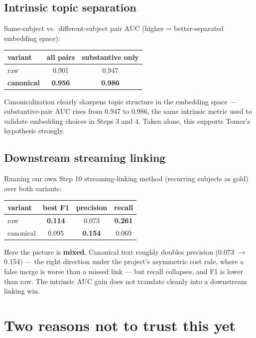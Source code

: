 \documentclass[11pt,a4paper]{article}
\begin{document}
\subsection{Intrinsic topic separation}

Same-subject vs.\ different-subject pair AUC (higher = better-separated embedding space):

\begin{center}
\begin{tabular}{lcc}
\toprule
variant & all pairs & substantive only \\
\midrule
raw & 0.901 & 0.947 \\
\textbf{canonical} & \textbf{0.956} & \textbf{0.986} \\
\bottomrule
\end{tabular}
\end{center}

Canonicalization clearly sharpens topic structure in the embedding space --- substantive-pair
AUC rises from 0.947 to 0.986, the same intrinsic metric used to validate embedding choices
in Steps 3 and 4. Taken alone, this supports Tomer's hypothesis strongly.

\subsection{Downstream streaming linking}

Running our own Step 10 streaming-linking method (recurring subjects as gold) over both
variants:

\begin{center}
\begin{tabular}{lccc}
\toprule
variant & best F1 & precision & recall \\
\midrule
raw & \textbf{0.114} & 0.073 & \textbf{0.261} \\
canonical & 0.095 & \textbf{0.154} & 0.069 \\
\bottomrule
\end{tabular}
\end{center}

Here the picture is \textbf{mixed}. Canonical text roughly doubles precision (0.073
$\rightarrow$ 0.154) --- the right direction under the project's asymmetric cost rule, where
a false merge is worse than a missed link --- but recall collapses, and F1 is lower than raw.
The intrinsic AUC gain does not translate cleanly into a downstream linking win.

\section{Two reasons not to trust this yet}
\end{document}

